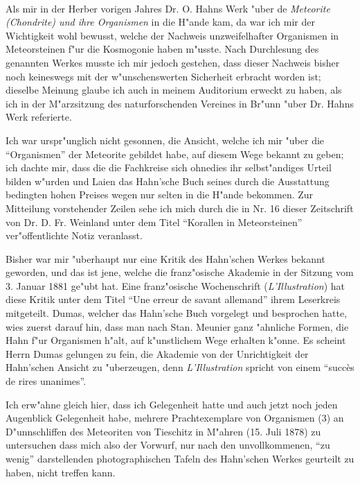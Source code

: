 \documentclass[a4paper, 12pt, oneside]{article}
\begin{document}
\paragraph{}
Als mir in der Herber vorigen Jahres Dr. O. Hahns Werk "uber de \emph{Meteorite (Chondrite) und ihre Organismen} in die H"ande kam, da war ich mir der Wichtigkeit wohl bewusst, welche der Nachweis unzweifelhafter Organismen in Meteorsteinen f"ur die Kosmogonie haben m"usste. Nach Durchlesung des genannten Werkes musste ich mir jedoch gestehen, dass dieser Nachweis bisher noch keineswegs mit der w"unschenswerten Sicherheit erbracht worden ist; dieselbe Meinung glaube ich auch in meinem Auditorium erweckt zu haben, als ich in der M"arzsitzung des naturforschenden Vereines in Br"unn "uber Dr. Hahns Werk referierte.

Ich war urspr"unglich nicht gesonnen, die Ansicht, welche ich mir "uber die "`Organismen"' der Meteorite gebildet habe, auf diesem Wege bekannt zu geben; ich dachte mir, dass die die Fachkreise sich ohnedies ihr selbst"andiges Urteil bilden w"urden und Laien das Hahn'sche Buch seines durch die Ausstattung bedingten hohen Preises wegen nur selten in die H"ande bekommen. Zur Mitteilung vorstehender Zeilen sehe ich mich durch die in Nr. 16 dieser Zeitschrift von Dr. D. Fr. Weinland unter dem Titel "`Korallen in Meteorsteinen"' ver"offentlichte Notiz veranlasst.

Bisher war mir "uberhaupt nur eine Kritik des Hahn'schen Werkes bekannt geworden, und das ist jene, welche die franz"osische Akademie in der Sitzung vom 3. Januar 1881 ge"ubt hat. Eine franz"osische Wochenschrift (\emph{L'Illustration}) hat diese Kritik unter dem Titel "`Une erreur de savant allemand"' ihrem Leserkreis mitgeteilt. Dumas, welcher das Hahn'sche Buch vorgelegt und besprochen hatte, wies zuerst darauf hin, dass man nach Stan. Meunier ganz "ahnliche Formen, die Hahn f"ur Organismen h"alt, auf k"unstlichem Wege erhalten k"onne. Es scheint Herrn Dumas gelungen zu fein, die Akademie von der Unrichtigkeit der Hahn'schen Ansicht zu "uberzeugen, denn \emph{L'Illustration} spricht von einem "`succès de rires unanimes"'.

Ich erw"ahne gleich hier, dass ich Gelegenheit hatte und auch jetzt noch jeden Augenblick Gelegenheit habe, mehrere Prachtexemplare von Organismen (3) an D"unnschliffen des Meteoriten von Tieschitz in M"ahren (15. Juli 1878) zu untersuchen dass mich also der Vorwurf, nur nach den unvollkommenen, "`zu wenig"' darstellenden photographischen Tafeln des Hahn'schen Werkes geurteilt zu haben, nicht treffen kann.
\end{document}
